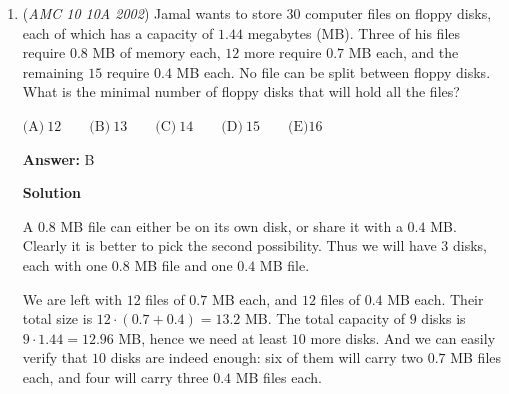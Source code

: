 \begin{enumerate}
 $\text{(A)}\ 7/2 \qquad \text{(B)}\ 4 \qquad \text{(C)}\ 5 \qquad \text{(D)}\ 7 \qquad \text{(E)}\ 13$

 \textbf{Answer: }A



\textbf{Solution 1}

We expand to get $2x^2-8x+3x-12+2x^2-12x+3x-18=0$ which is $4x^2-14x-30=0$ after combining like terms. Using the quadratic part of \href{https://artofproblemsolving.com/wiki/index.php?title=Vieta\%27s\_Formulas}{Vieta's Formulas}, we find the sum of the roots is $\frac{14}4 = \boxed{\textbf{(A) }7/2}$.

 



\textbf{Solution 2}

We see a $(2x+3)$ term in both addends so we can factor the equation to $(2x+3)((x-4)+(x-6))=(2x+3)(2x-10)=0.$ The two roots become obvious: they are $-\frac{3}{2}$ and $\frac{10}{2}.$ Adding these two gives $\boxed{\textbf{(A) }7/2}.$

 -starwarmonkey

 


	\item (\textit{AMC 10 10A 2002}) Jamal wants to store $30$ computer files on floppy disks, each of which has a capacity of $1.44$ megabytes (MB). Three of his files require $0.8$ MB of memory each, $12$ more require $0.7$ MB each, and the remaining $15$ require $0.4$ MB each. No file can be split between floppy disks. What is the minimal number of floppy disks that will hold all the files?


 $\text{(A)}\ 12 \qquad \text{(B)}\ 13 \qquad \text{(C)}\ 14 \qquad \text{(D)}\ 15 \qquad \text{(E)} 16$

 \textbf{Answer: }B



\textbf{Solution}

A $0.8$ MB file can either be on its own disk, or share it with a $0.4$ MB. Clearly it is better to pick the second possibility. Thus we will have $3$ disks, each with one $0.8$ MB file and one $0.4$ MB file.

 We are left with $12$ files of $0.7$ MB each, and $12$ files of $0.4$ MB each. Their total size is $12\cdot (0.7 + 0.4) = 13.2$ MB. The total capacity of $9$ disks is $9\cdot 1.44 = 12.96$ MB, hence we need at least $10$ more disks. And we can easily verify that $10$ disks are indeed enough: six of them will carry two $0.7$ MB files each, and four will carry three $0.4$ MB files each.


\end{enumerate}
